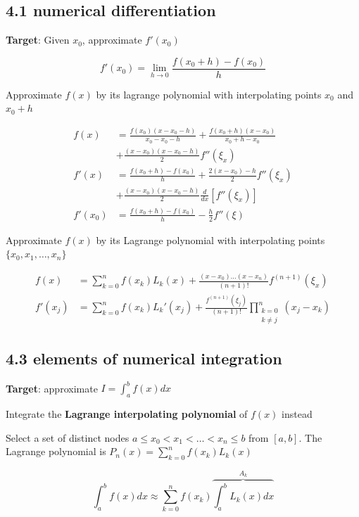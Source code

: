 \documentclass[11pt]{article}
\begin{document}
\subsection{4.1 numerical differentiation}
\label{sec:org25c9fb7}
\textbf{Target}: Given \(x_0\), approximate \(f'(x_0)\)

\begin{equation*}
f'(x_0)=\lim\limits_{h\to0}\frac{f(x_0+h)-f(x_0)}{h}
\end{equation*}

Approximate \(f(x)\) by its lagrange polynomial with interpolating points \(x_0\)
and \(x_0+h\)

\begin{align*}
f(x)&=\frac{f(x_0)(x-x_0-h)}{x_0-x_0-h}+\frac{f(x_0+h)(x-x_0)}{x_0+h-x_0}\\
&+\frac{(x-x_0)(x-x_0-h)}{2}f''(\xi_x)\\
f'(x)&=\frac{f(x_0+h)-f(x_0)}{h}+\frac{2(x-x_0)-h}{2}f''(\xi_x)\\
&+\frac{(x-x_0)(x-x_0-h)}{2}\frac{d}{dx}[f''(\xi_x)]\\
f'(x_0)&=\frac{f(x_0+h)-f(x_0)}{h}-\frac{h}{2}f''(\xi)
\end{align*}

Approximate \(f(x)\) by its Lagrange polynomial with interpolating points
\(\{x_0,x_1,\dots,x_n\}\)

\begin{align*}
f(x)&=\displaystyle\sum_{k=0}^nf(x_k)L_k(x)+\frac{(x-x_0)\dots(x-x_n)}{(n+1)!}
f^{(n+1)}(\xi_x)\\
f'(x_j)&=\displaystyle\sum_{k=0}^nf(x_k)L_k'(x_j)+\frac{f^{(n+1)}(\xi_j)}{(n+1)!}
\displaystyle\prod_{\substack{k=0\\k\neq j}}^n(x_j-x_k)
\end{align*}
\subsection{4.3 elements of numerical integration}
\label{sec:orgcf85682}
\textbf{Target}: approximate \(I=\int_a^bf(x)dx\)

Integrate the \textbf{Lagrange interpolating polynomial} of \(f(x)\) instead

Select a set of distinct nodes \(a\le x_0<x_1<\dots<x_n\le b\) from \([a,b]\).
The Lagrange polynomial is \(P_n(x)=\displaystyle\sum_{k=0}^nf(x_k)L_k(x)\)

\begin{equation*}
\int_a^bf(x)dx\approx \displaystyle\sum_{k=0}^nf(x_k)
\overbrace{\int_a^b L_k(x)dx}^{A_k}
\end{equation*}
\end{document}
